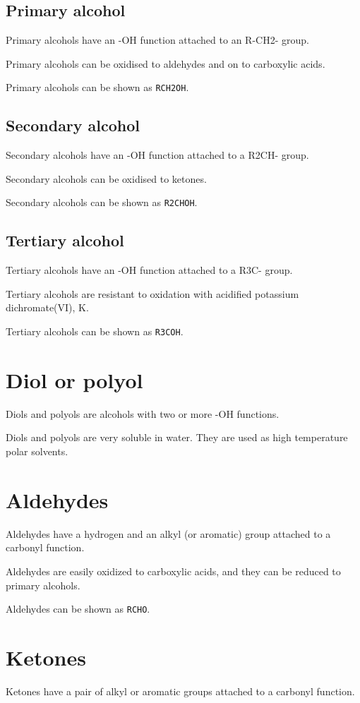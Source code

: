 \documentclass[oneside]{book} %
\theoremstyle{plain}
\begin{document}
\subsection{Primary alcohol}
Primary alcohols have an -OH function attached to an R-CH2- group.

Primary alcohols can be oxidised to aldehydes and on to carboxylic acids.

Primary alcohols can be shown as \texttt{RCH2OH}.

\subsection{Secondary alcohol}
Secondary alcohols have an -OH function attached to a R2CH- group.

Secondary alcohols can be oxidised to ketones.

Secondary alcohols can be shown as \texttt{R2CHOH}.

\subsection{Tertiary alcohol}
Tertiary alcohols have an -OH function attached to a R3C- group.

Tertiary alcohols are resistant to oxidation with acidified potassium
dichromate(VI), K.

Tertiary alcohols can be shown as \texttt{R3COH}.

\section{Diol or polyol}
Diols and polyols are alcohols with two or more -OH functions.

Diols and polyols are very soluble in water. They are used as high temperature
polar solvents.

\section{Aldehydes}
Aldehydes have a hydrogen and an alkyl (or aromatic) group attached to a
carbonyl function.

Aldehydes are easily oxidized to carboxylic acids, and they can be reduced to
primary alcohols.

Aldehydes can be shown as \texttt{RCHO}.

\section{Ketones}
Ketones have a pair of alkyl or aromatic groups attached to a carbonyl function.
\end{document}

